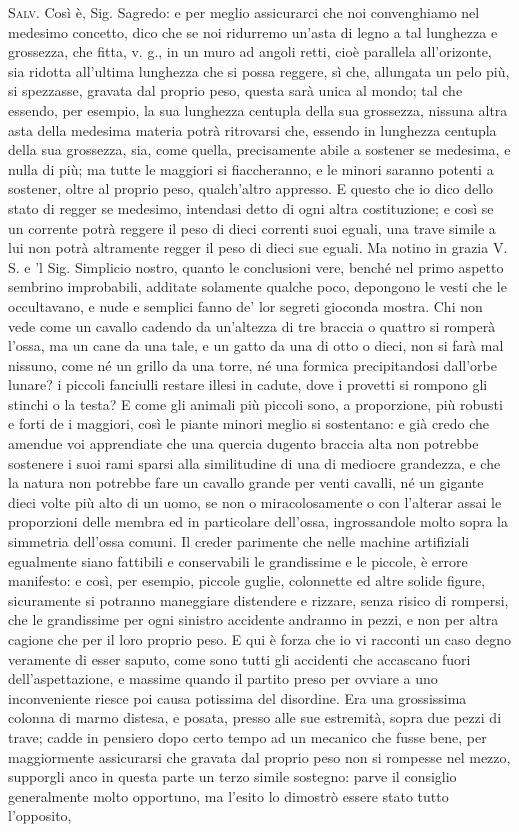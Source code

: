 \documentclass[11pt,twoside,openany]{book}
\newcommand{\speaker}[1]{\textcolor{rubric}{\textsc{#1}}\space}
\begin{document}
\speaker{Salv.} Così è, Sig. Sagredo: e per meglio assicurarci che noi convenghiamo nel medesimo concetto, dico che se noi ridurremo un'asta di legno a tal lunghezza e grossezza, che fitta, v. g., in un muro ad angoli retti, cioè parallela all'orizonte, sia ridotta all'ultima lunghezza che si possa reggere, sì che, allungata un pelo più, si spezzasse, gravata dal proprio peso, questa sarà unica al mondo; tal che essendo, per esempio, la sua lunghezza centupla della sua grossezza, nissuna altra asta della medesima materia potrà ritrovarsi che, essendo in lunghezza centupla della sua grossezza, sia, come quella, precisamente abile a sostener se medesima, e nulla di più; ma tutte le maggiori si fiaccheranno, e le minori saranno potenti a sostener, oltre al proprio peso, qualch'altro appresso. E questo che io dico dello stato di regger se medesimo, intendasi detto di ogni altra costituzione; e così se un corrente potrà reggere il peso di dieci correnti suoi eguali, una trave simile a lui non potrà altramente regger il peso di dieci sue eguali. Ma notino in grazia V. S. e 'l Sig. Simplicio nostro, quanto le conclusioni vere, benché nel primo aspetto sembrino improbabili, additate solamente qualche poco, depongono le vesti che le occultavano, e nude e semplici fanno de' lor segreti gioconda mostra. Chi non vede come un cavallo cadendo da un'altezza di tre braccia o quattro si romperà l'ossa, ma un cane da una tale, e un gatto da una di otto o dieci, non si farà mal nissuno, come né un grillo da una torre, né una formica precipitandosi dall'orbe lunare? i piccoli fanciulli restare illesi in cadute, dove i provetti si rompono gli stinchi o la testa? E come gli animali più piccoli sono, a proporzione, più robusti e forti de i maggiori, così le piante minori meglio si sostentano: e già credo che amendue voi apprendiate che una quercia dugento braccia alta non potrebbe sostenere i suoi rami sparsi alla similitudine di una di mediocre grandezza, e che la natura non potrebbe fare un cavallo grande per venti cavalli, né un gigante dieci volte più alto di un uomo, se non o miracolosamente o con l'alterar assai le proporzioni delle membra ed in particolare dell'ossa, ingrossandole molto sopra la simmetria dell'ossa comuni. Il creder parimente che nelle machine artifiziali egualmente siano fattibili e conservabili le grandissime e le piccole, è errore manifesto: e così, per esempio, piccole guglie, colonnette ed altre solide figure, sicuramente si potranno maneggiare distendere e rizzare, senza risico di rompersi, che le grandissime per ogni sinistro accidente andranno in pezzi, e non per altra cagione che per il loro proprio peso. E qui è forza che io vi racconti un caso degno veramente di esser saputo, come sono tutti gli accidenti che accascano fuori dell'aspettazione, e massime quando il partito preso per ovviare a uno inconveniente riesce poi causa potissima del disordine. Era una grossissima colonna di marmo distesa, e posata, presso alle sue estremità, sopra due pezzi di trave; cadde in pensiero dopo certo tempo ad un mecanico che fusse bene, per maggiormente assicurarsi che gravata dal proprio peso non si rompesse nel mezzo, supporgli anco in questa parte un terzo simile sostegno: parve il consiglio generalmente molto opportuno, ma l'esito lo dimostrò essere stato tutto l'opposito, 
\end{document}
